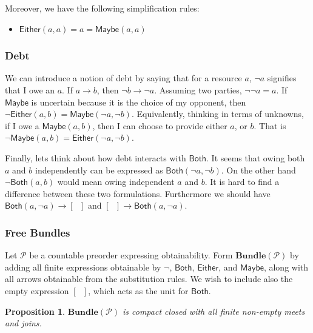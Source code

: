 \documentclass[12pt]{article}
\theoremstyle{definition}
\theoremstyle{plain}
\theoremstyle{plain}
\newtheorem{proposition}{Proposition}[section]
\theoremstyle{plain}
\theoremstyle{plain}
\theoremstyle{remark}
\theoremstyle{remark}
\begin{document}
Moreover, we have the following simplification rules:
\begin{itemize}
	\item $\mathsf{Either}(a,a) = a = \mathsf{Maybe}(a,a)$
\end{itemize}

\subsubsection{Debt}
We can introduce a notion of debt by saying that for a resource $a$, $\neg a$ signifies that I owe an $a$. If $a \rightarrow b$, then $\neg b \rightarrow \neg a$. Assuming two parties, $\neg\neg a=a$. If $\mathsf{Maybe}$ is uncertain because it is the choice of my opponent, then $\neg \mathsf{Either}(a,b) = \mathsf{Maybe}(\neg a, \neg b)$. Equivalently, thinking in terms of unknowns, if I owe a $\mathsf{Maybe}(a,b)$, then I can choose to provide either $a$, or $b$. That is $\neg \mathsf{Maybe}(a,b) = \mathsf{Either}(\neg a, \neg b)$.

Finally, lets think about how debt interacts with $\mathsf{Both}$. It seems that owing both $a$ and $b$ independently can be expressed as $\mathsf{Both}(\neg a, \neg b)$. On the other hand $\neg \mathsf{Both}(a, b)$ would mean owing independent $a$ and $b$. It is hard to find a difference between these two formulations. Furthermore we should have $\mathsf{Both}(a, \neg a) \rightarrow [ \phantom{n}]$ and $[ \phantom{n}] \rightarrow \mathsf{Both}(a, \neg a)$.

\subsubsection{Free Bundles}

Let $\mathcal{P}$ be a countable preorder expressing obtainability. Form $\mathbf{Bundle}(\mathcal{P})$ by adding all finite expressions obtainable by $\neg$, $\mathsf{Both}$, $\mathsf{Either}$, and $\mathsf{Maybe}$, along with all arrows obtainable from the substitution rules. We wish to include also the empty expression $[ \phantom{n} ]$, which acts as the unit for $\mathsf{Both}$.

\begin{proposition} $\mathbf{Bundle}(\mathcal{P})$ is compact closed with all finite non-empty meets and joins.
\end{proposition}
\end{document}
